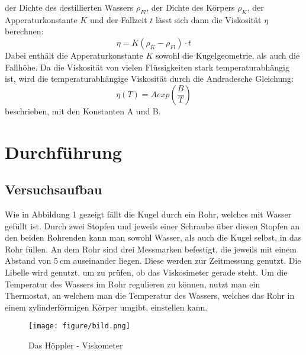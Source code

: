 \documentclass[titlepage=firstiscover, bibliography=totoc, captions=tableheading]{scrartcl}
\begin{document}
der Dichte des destillierten Wassers $\rho_{Fl}$, der Dichte des Körpers $\rho_K$,
der Apperaturkonstante $K$ und der Fallzeit $t$ lässt sich dann die Viskosität
$\eta$ berechnen:
\begin{equation}
  \eta = K (\rho_K - \rho_{Fl}) \cdot t
  \label{eqn:dynVisk}
\end{equation}
Dabei enthält die Apperaturkonstante $K$ sowohl die Kugelgeometrie, als auch
die Fallhöhe. Da die Viskosität von vielen Flüssigkeiten stark
temperaturabhängig ist, wird die temperaturabhängige Viskosität durch die
Andradesche Gleichung:
\begin{equation}
  \eta(T) = A exp (\frac{B}{T})
  \label{eqn:dynViskvonT}
\end{equation}
beschrieben, mit den Konstanten A und B.

\section{Durchführung}
\label{sec:durchführung}
\subsection{Versuchsaufbau}
Wie in Abbildung 1 gezeigt fällt die Kugel durch ein Rohr, welches mit Wasser
gefüllt ist. Durch zwei Stopfen und jeweils einer Schraube über diesen Stopfen
an den beiden Rohrenden kann man sowohl Wasser, als auch die Kugel selbst, in das
Rohr füllen. An dem Rohr sind drei Messmarken befestigt, die jeweils mit einem
Abstand von $\SI{5}{\centi\meter}$ auseinander liegen. Diese werden zur Zeitmessung genutzt. Die
Libelle wird genutzt, um zu prüfen, ob das Viskosimeter gerade steht. Um die
Temperatur des Wassers im Rohr regulieren zu können, nutzt man ein Thermostat,
an welchem man die Temperatur des Wassers, welches das Rohr in einem
zylinderförmigen Körper umgibt, einstellen kann.
\begin{figure}[htb]
  \centering
  \texttt{[image: figure/bild.png]}
  \caption{Das Höppler - Viskometer}
  \label{fig:viskosimeter}
\end{figure}
\end{document}
